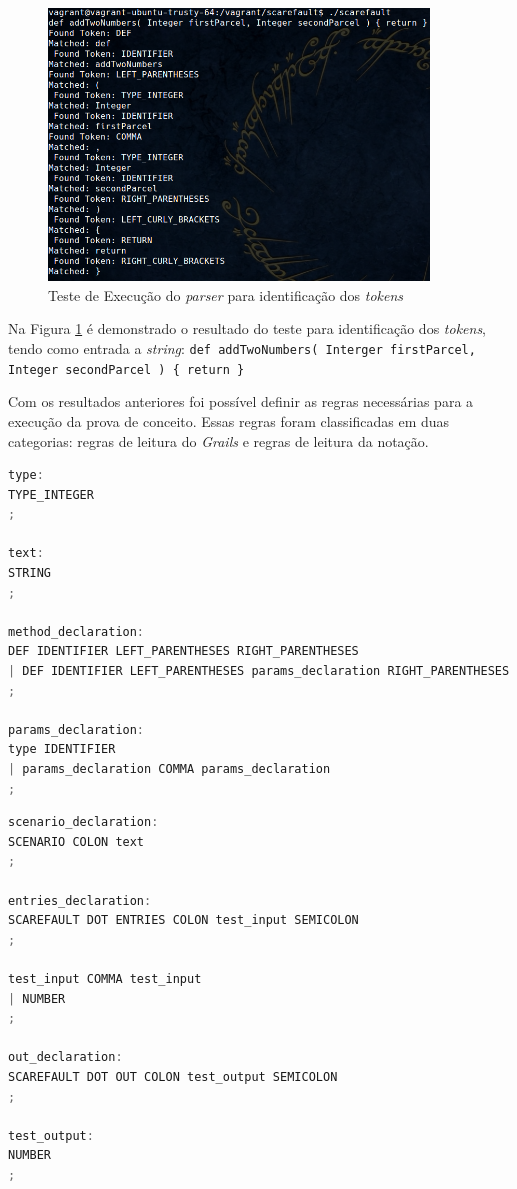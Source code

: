  \begin{figure}[h]
    \centering
    \includegraphics[width=0.9\textwidth]{figuras/second-test-grammar.png}
    \caption{Teste de Execução do \textit{parser} para identificação dos \textit{tokens}}
    \label{fig:test-tokens}
 \end{figure}
\par
\indent Na Figura \ref{fig:test-tokens} é demonstrado o resultado do teste para
identificação dos \textit{tokens}, tendo como entrada a \textit{string}:
\lstinline|def addTwoNumbers( Interger firstParcel, Integer secondParcel ) { return }|
\par
\indent Com os resultados anteriores foi possível definir as regras necessárias
para a execução da prova de conceito. Essas regras foram classificadas em duas
categorias: regras de leitura do \textit{Grails} e regras de leitura da notação.
\par
\begin{lstlisting}[language=C++, label=rules-grails, caption=Regras de Leitura do \textit{Grails}]
type:
TYPE_INTEGER
;

text:
STRING
;

method_declaration:
DEF IDENTIFIER LEFT_PARENTHESES RIGHT_PARENTHESES
| DEF IDENTIFIER LEFT_PARENTHESES params_declaration RIGHT_PARENTHESES
;

params_declaration:
type IDENTIFIER
| params_declaration COMMA params_declaration
;
\end{lstlisting}
\par
\begin{lstlisting}[language=C++, label=rules-scarefault, caption=Regras de Leitura da notação]
scenario_declaration:
SCENARIO COLON text
;

entries_declaration:
SCAREFAULT DOT ENTRIES COLON test_input SEMICOLON
;

test_input COMMA test_input
| NUMBER
;

out_declaration:
SCAREFAULT DOT OUT COLON test_output SEMICOLON
;

test_output:
NUMBER
;
\end{lstlisting}
